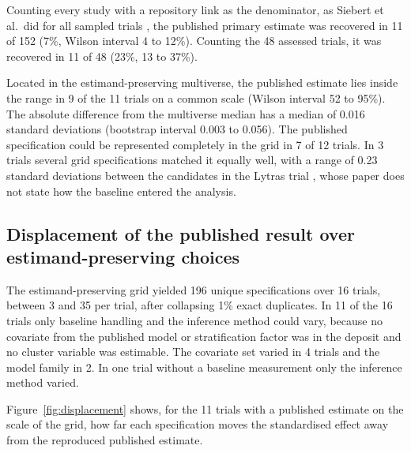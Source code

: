 Counting every study with a repository link as the denominator, as Siebert et al.~did for all sampled trials \cite{Siebert_2022}, the published primary estimate was recovered in 11 of 152 (7\%, Wilson interval 4 to 12\%). Counting the 48 assessed trials, it was recovered in 11 of 48 (23\%, 13 to 37\%).

Located in the estimand-preserving multiverse, the published estimate lies inside the range in 9 of the 11 trials on a common scale (Wilson interval 52 to 95\%). The absolute difference from the multiverse median has a median of 0.016 standard deviations (bootstrap interval 0.003 to 0.056). The published specification could be represented completely in the grid in 7 of 12 trials. In 3 trials several grid specifications matched it equally well, with a range of 0.23 standard deviations between the candidates in the Lytras trial \cite{Lytras_2026}, whose paper does not state how the baseline entered the analysis.

\subsection{Displacement of the published result over estimand-preserving choices}\label{displacement-of-the-published-result-over-estimand-preserving-choices}

The estimand-preserving grid yielded 196 unique specifications over 16 trials, between 3 and 35 per trial, after collapsing 1\% exact duplicates. In 11 of the 16 trials only baseline handling and the inference method could vary, because no covariate from the published model or stratification factor was in the deposit and no cluster variable was estimable. The covariate set varied in 4 trials and the model family in 2. In one trial without a baseline measurement only the inference method varied.

Figure~\ref{fig:displacement} shows, for the 11 trials with a published estimate on the scale of the grid, how far each specification moves the standardised effect away from the reproduced published estimate.

